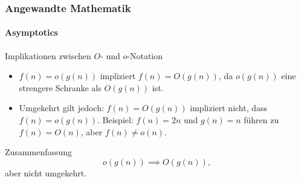 \documentclass{beamer}
\begin{document}
\begin{frame}
    \frametitle{Angewandte Mathematik}
    \framesubtitle{Asymptotics}
 
    \begin{block}{Implikationen zwischen \( O \)- und \( o \)-Notation}
        \begin{itemize}
            \item \( f(n) = o(g(n)) \) impliziert \( f(n) = O(g(n)) \), da \( o(g(n)) \) eine strengere Schranke als \( O(g(n)) \) ist.
            \item Umgekehrt gilt jedoch: \( f(n) = O(g(n)) \) impliziert nicht, dass \( f(n) = o(g(n)) \). Beispiel: \( f(n) = 2n \) und \( g(n) = n \) führen zu \( f(n) = O(n) \), aber \( f(n) \neq o(n) \).
        \end{itemize}
    \end{block}

    \begin{exampleblock}{Zusammenfassung}
        \[
        o(g(n)) \implies O(g(n)),
        \]
        aber nicht umgekehrt.
    \end{exampleblock}
\end{frame}
\end{document}
